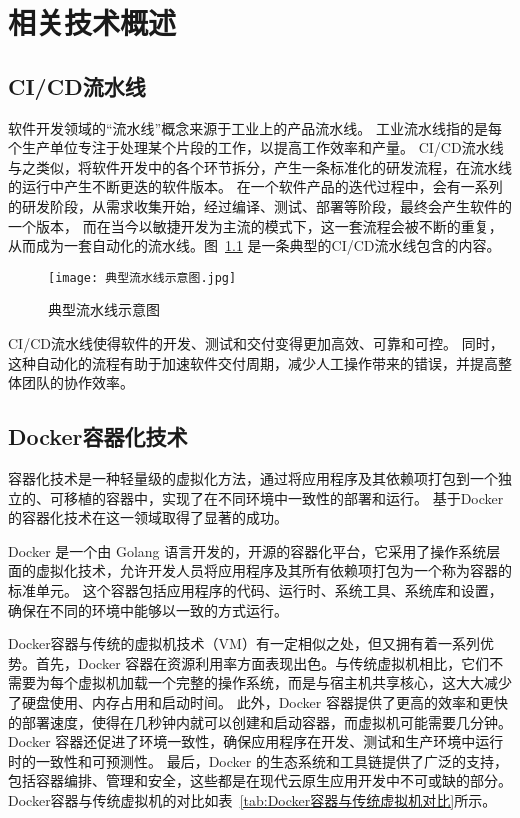 
\chapter{相关技术概述}

\section{CI/CD流水线}
软件开发领域的“流水线”概念来源于工业上的产品流水线。
工业流水线指的是每个生产单位专注于处理某个片段的工作，以提高工作效率和产量。
CI/CD流水线与之类似，将软件开发中的各个环节拆分，产生一条标准化的研发流程，在流水线的运行中产生不断更迭的软件版本。
在一个软件产品的迭代过程中，会有一系列的研发阶段，从需求收集开始，经过编译、测试、部署等阶段，最终会产生软件的一个版本，
而在当今以敏捷开发为主流的模式下，这一套流程会被不断的重复，从而成为一套自动化的流水线。图~\ref{fig:典型流水线示意图} 是一条典型的CI/CD流水线包含的内容。

\begin{figure}[h]
    \centering
    \texttt{[image: 典型流水线示意图.jpg]}
    \caption{典型流水线示意图}
    \label{fig:典型流水线示意图}
  \end{figure}

CI/CD流水线使得软件的开发、测试和交付变得更加高效、可靠和可控\cite{mohammad2016continuous}。
同时，这种自动化的流程有助于加速软件交付周期，减少人工操作带来的错误，并提高整体团队的协作效率。

\section{Docker容器化技术}
容器化技术是一种轻量级的虚拟化方法，通过将应用程序及其依赖项打包到一个独立的、可移植的容器中，实现了在不同环境中一致性的部署和运行。
基于Docker的容器化技术在这一领域取得了显著的成功。

Docker 是一个由 Golang 语言开发的，开源的容器化平台，它采用了操作系统层面的虚拟化技术，允许开发人员将应用程序及其所有依赖项打包为一个称为容器的标准单元\cite{第二章Docker}。
这个容器包括应用程序的代码、运行时、系统工具、系统库和设置，确保在不同的环境中能够以一致的方式运行。

Docker容器与传统的虚拟机技术（VM）有一定相似之处，但又拥有着一系列优势。首先，Docker 容器在资源利用率方面表现出色\cite{张忠琳2014基于}。与传统虚拟机相比，它们不需要为每个虚拟机加载一个完整的操作系统，而是与宿主机共享核心，这大大减少了硬盘使用、内存占用和启动时间。
此外，Docker 容器提供了更高的效率和更快的部署速度，使得在几秒钟内就可以创建和启动容器，而虚拟机可能需要几分钟\cite{JSJY201704001}。
Docker 容器还促进了环境一致性，确保应用程序在开发、测试和生产环境中运行时的一致性和可预测性。
最后，Docker 的生态系统和工具链提供了广泛的支持\cite{DGJB201806026}，包括容器编排、管理和安全，这些都是在现代云原生应用开发中不可或缺的部分。
Docker容器与传统虚拟机的对比如表~\ref{tab:Docker容器与传统虚拟机对比}所示。


